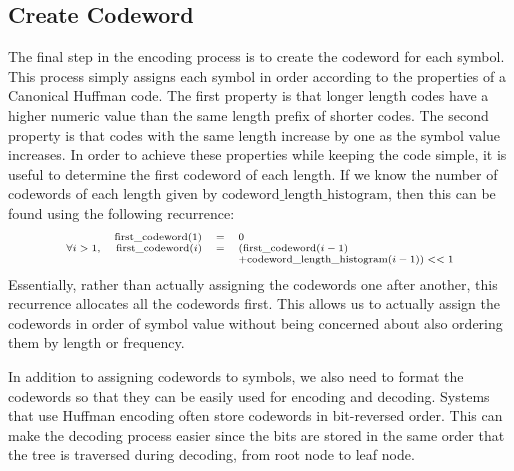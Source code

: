 \subsection{Create Codeword}
\label{sec:create_codewords}

The final step in the encoding process is to create the codeword for each symbol.  This process simply assigns each symbol in order according to the properties of a Canonical Huffman code.  The first property is that longer length codes have a higher numeric value than the same length prefix of shorter codes.  The second property is that codes with the same length increase by one as the symbol value increases.  In order to achieve these properties while keeping the code simple, it is useful to determine the first codeword of each length.  If we know the number of codewords of each length given by $\mathrm{codeword\_length\_histogram}$, then this can be found using the following recurrence:
\begin{equation}
\begin{scriptsize}
\begin{array} {rrcl}
               &\mathrm{first\_codeword}(1) &=& 0 \\
\forall i > 1, &\mathrm{first\_codeword}(i) &=& (\mathrm{first\_codeword}(i-1) \\
               &                            & & +  \mathrm{codeword\_length\_histogram}(i-1)) << 1
\label{eq:first_codeword_recurrence}
\end{array}
\end{scriptsize}
\end{equation}  
Essentially, rather than actually assigning the codewords one after another, this recurrence allocates all the codewords first.  This allows us to actually assign the codewords in order of symbol value without being concerned about also ordering them by length or frequency.

In addition to assigning codewords to symbols, we also need to format the codewords so that they can be easily used for encoding and decoding.  Systems that use Huffman encoding often store codewords in bit-reversed order. This can make the decoding process easier since the bits are stored in the same order that the tree is traversed during decoding, from root node to leaf node. 

